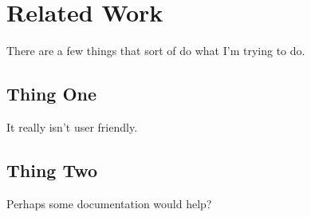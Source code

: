 \chapter{Related Work}
 
There are a few things that sort of do what I'm trying to do.

 
\section{Thing One}
 
It really isn't user friendly.


\section{Thing Two}

Perhaps some documentation would help?
